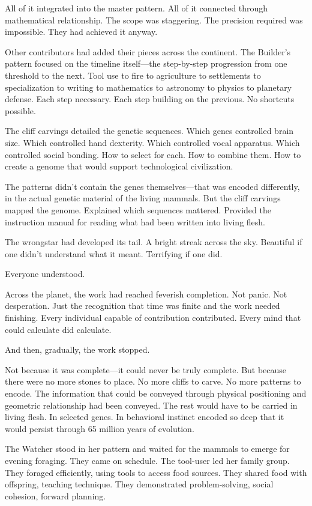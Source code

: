 All of it integrated into the master pattern. All of it connected through mathematical relationship. The scope was staggering. The precision required was impossible. They had achieved it anyway.

Other contributors had added their pieces across the continent. The Builder's pattern focused on the timeline itself—the step-by-step progression from one threshold to the next. Tool use to fire to agriculture to settlements to specialization to writing to mathematics to astronomy to physics to planetary defense. Each step necessary. Each step building on the previous. No shortcuts possible.

The cliff carvings detailed the genetic sequences. Which genes controlled brain size. Which controlled hand dexterity. Which controlled vocal apparatus. Which controlled social bonding. How to select for each. How to combine them. How to create a genome that would support technological civilization.

The patterns didn't contain the genes themselves—that was encoded differently, in the actual genetic material of the living mammals. But the cliff carvings mapped the genome. Explained which sequences mattered. Provided the instruction manual for reading what had been written into living flesh.

\scenebreak

The wrongstar had developed its tail. A bright streak across the sky. Beautiful if one didn't understand what it meant. Terrifying if one did.

Everyone understood.

Across the planet, the work had reached feverish completion. Not panic. Not desperation. Just the recognition that time was finite and the work needed finishing. Every individual capable of contribution contributed. Every mind that could calculate did calculate.

And then, gradually, the work stopped.

Not because it was complete—it could never be truly complete. But because there were no more stones to place. No more cliffs to carve. No more patterns to encode. The information that could be conveyed through physical positioning and geometric relationship had been conveyed. The rest would have to be carried in living flesh. In selected genes. In behavioral instinct encoded so deep that it would persist through 65 million years of evolution.

The Watcher stood in her pattern and waited for the mammals to emerge for evening foraging. They came on schedule. The tool-user led her family group. They foraged efficiently, using tools to access food sources. They shared food with offspring, teaching technique. They demonstrated problem-solving, social cohesion, forward planning.

